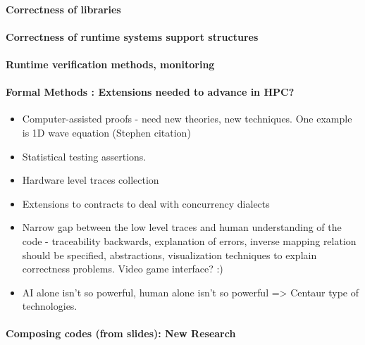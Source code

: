 {   \paragraph{Correctness of libraries}
   
   \paragraph{Correctness of runtime systems support structures}
    
   \paragraph{Runtime verification methods, monitoring}
   
   \paragraph{Formal Methods : Extensions needed
    to advance in HPC?}
    
     
\begin{itemize}
\item Computer-assisted proofs - need new theories, new techniques. One example is 1D wave equation (Stephen citation)



\item Statistical testing assertions. 

\item Hardware level traces collection 

\item Extensions to contracts to deal with concurrency dialects

\item Narrow gap between the low level traces and human understanding of the code - traceability backwards, explanation of errors, inverse mapping relation should be specified, abstractions, visualization techniques to explain correctness problems. Video game interface? :) 

\item AI alone isn’t so powerful, human alone isn’t so powerful => Centaur type of technologies. 

\end{itemize}

   \paragraph{Composing codes (from slides): New Research} 
   
}
